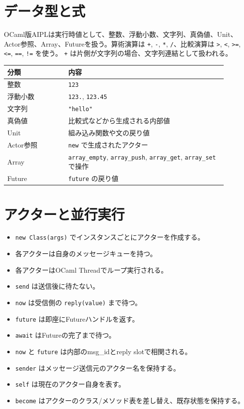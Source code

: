 \documentclass[11pt,a4paper,uplatex,dvipdfmx]{jsarticle}
\begin{document}
\section{データ型と式}

OCaml版AIPLは実行時値として、整数、浮動小数、文字列、真偽値、Unit、
Actor参照、Array、Futureを扱う。算術演算は \texttt{+}, \texttt{-},
\texttt{*}, \texttt{/}、比較演算は \texttt{>}, \texttt{<}, \texttt{>=},
\texttt{<=}, \texttt{==}, \texttt{!=} を使う。
\texttt{+} は片側が文字列の場合、文字列連結として扱われる。

\begin{longtable}{p{0.25\linewidth}p{0.65\linewidth}}
\toprule
分類 & 内容 \\
\midrule
整数 & \texttt{123} \\
浮動小数 & \texttt{123.}, \texttt{123.45} \\
文字列 & \texttt{"hello"} \\
真偽値 & 比較式などから生成される内部値 \\
Unit & 組み込み関数や文の戻り値 \\
Actor参照 & \texttt{new} で生成されたアクター \\
Array & \texttt{array\_empty}, \texttt{array\_push}, \texttt{array\_get}, \texttt{array\_set} で操作 \\
Future & \texttt{future} の戻り値 \\
\bottomrule
\end{longtable}

\section{アクターと並行実行}

\begin{itemize}
  \item \texttt{new Class(args)} でインスタンスごとにアクターを作成する。
  \item 各アクターは自身のメッセージキューを持つ。
  \item 各アクターはOCaml Threadでループ実行される。
  \item \texttt{send} は送信後に待たない。
  \item \texttt{now} は受信側の \texttt{reply(value)} まで待つ。
  \item \texttt{future} は即座にFutureハンドルを返す。
  \item \texttt{await} はFutureの完了まで待つ。
  \item \texttt{now} と \texttt{future} は内部のmsg\_idとreply slotで相関される。
  \item \texttt{sender} はメッセージ送信元のアクター名を保持する。
  \item \texttt{self} は現在のアクター自身を表す。
  \item \texttt{become} はアクターのクラス/メソッド表を差し替え、既存状態を保持する。
\end{itemize}
\end{document}
